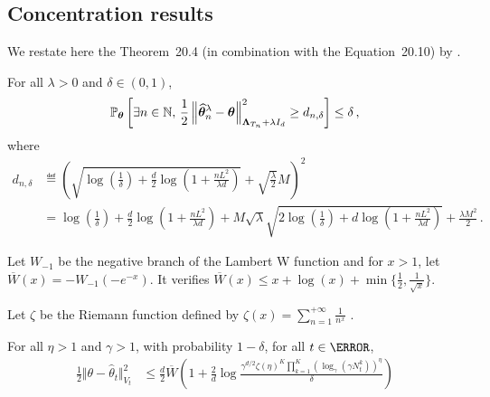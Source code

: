 \subsection{Concentration results}\label{app:lgc.lemmas.concentration}

We restate here the Theorem~20.4 (in combination with the Equation~20.10) by \citet{lattimore2018bandits}.
\begin{theorem}
\label{th:confidence_beta}
For all $\lambda >0$ and $\delta\in(0,1)$,
\[
    \mathbb{P}_{\boldsymbol \theta}\left[\exists n\in{\mathbb N},\, \frac{1}{2}\left\lVert\widehat{{\boldsymbol \theta}}_n^\lambda-{\boldsymbol \theta}\right\rVert^2_{{\boldsymbol \Lambda}_{T_n}+\lambda I_d} \geq d_{n,\delta}\right] \leq \delta\,,
\]
where
\begin{align*}
    d_{n,\delta} &\eqdef  \left( \sqrt{\log\left( \frac{1}{\delta}\right)+\frac{d}{2}\log\left(1+\frac{n L^2}{\lambda d} \right)} +\sqrt{\frac{\lambda}{2}}M\right)^2\\
    &=\log\!\left( \frac{1}{\delta}\right)+\frac{d}{2}\log\left(1+\frac{n L^2}{\lambda d} \right) +  M\sqrt{\lambda}\sqrt{2\log\left( \frac{1}{\delta}\right)+d\log\!\left(1+\frac{n L^2}{\lambda d} \right)}+\frac{\lambda M^2}{2}\,.
\end{align*}
\end{theorem}


\iffalse
Let $W_{-1}$ be the negative branch of the Lambert W function and for $x>1$, let $\overline{W}(x) = -W_{-1}(-e^{-x})$. It verifies $\overline{W}(x) \le x + \log(x) + \min\{\frac{1}{2}, \frac{1}{\sqrt{x}}\}$.

Let $\zeta$ be the Riemann function defined by $\zeta(x) = \sum_{n=1}^{+\infty}\frac{1}{n^x}$ .

\begin{theorem}\label{thm:maximal_concentration_inequality}
For all $\eta>1$ and $\gamma>1$, with probability $1-\delta$, for all $t\in \N$,
\begin{align*}
\frac{1}{2} \Vert \theta - \hat{\theta}_t \Vert_{V_t}^2
&\le \frac{d}{2} \overline{W}\left( 1 + \frac{2}{d}\log \frac{\gamma^{d/2}\zeta(\eta)^K\prod_{k=1}^K(\log_\gamma(\gamma N_t^k))^\eta}{\delta} \right)
\end{align*}
\end{theorem}


